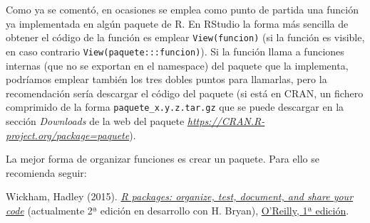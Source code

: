 \documentclass[
]{book}
\newenvironment{Shaded}{\begin{snugshade}}{\end{snugshade}}
\newcommand{\AttributeTok}[1]{\textcolor[rgb]{0.77,0.63,0.00}{#1}}
\newcommand{\CommentTok}[1]{\textcolor[rgb]{0.56,0.35,0.01}{\textit{#1}}}
\newcommand{\ConstantTok}[1]{\textcolor[rgb]{0.00,0.00,0.00}{#1}}
\newcommand{\ControlFlowTok}[1]{\textcolor[rgb]{0.13,0.29,0.53}{\textbf{#1}}}
\newcommand{\FunctionTok}[1]{\textcolor[rgb]{0.00,0.00,0.00}{#1}}
\newcommand{\NormalTok}[1]{#1}
\newcommand{\OtherTok}[1]{\textcolor[rgb]{0.56,0.35,0.01}{#1}}
\newcommand{\SpecialCharTok}[1]{\textcolor[rgb]{0.00,0.00,0.00}{#1}}
\newcommand{\StringTok}[1]{\textcolor[rgb]{0.31,0.60,0.02}{#1}}
\theoremstyle{break}
\theoremstyle{nonumberplain}
\begin{document}
\begin{Shaded}
\end{Shaded}

Como ya se comentó, en ocasiones se emplea como punto de partida una función ya implementada en algún paquete de R.
En RStudio la forma más sencilla de obtener el código de la función es emplear \texttt{View(funcion)} (si la función es visible, en caso contrario \texttt{View(paquete:::funcion)}).
Si la función llama a funciones internas (que no se exportan en el namespace) del paquete que la implementa, podríamos emplear también los tres dobles puntos para llamarlas, pero la recomendación sería descargar el código del paquete (si está en CRAN, un fichero comprimido de la forma \texttt{paquete\_x.y.z.tar.gz} que se puede descargar en la sección \emph{Downloads} de la web del paquete \emph{\url{https://CRAN.R-project.org/package=paquete}}).

La mejor forma de organizar funciones es crear un paquete.
Para ello se recomienda seguir:

Wickham, Hadley (2015). \emph{\href{http://r-pkgs.had.co.nz/}{R packages: organize, test, document, and share your code}} (actualmente 2ª edición en desarrollo con H. Bryan), \href{http://shop.oreilly.com/product/0636920034421.do}{O'Reilly, 1ª edición}.
\end{document}
